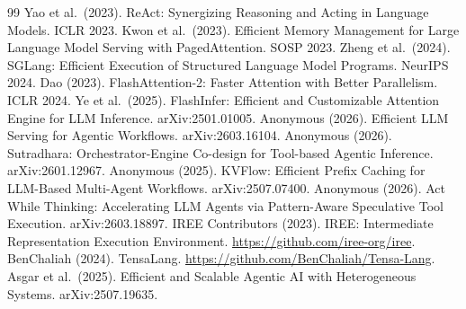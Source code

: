 \documentclass[10pt,twocolumn]{article}
\begin{document}

\begin{thebibliography}{99}
 Yao et al.\ (2023). ReAct: Synergizing Reasoning and Acting in Language Models. ICLR 2023.
 Kwon et al.\ (2023). Efficient Memory Management for Large Language Model Serving with PagedAttention. SOSP 2023.
 Zheng et al.\ (2024). SGLang: Efficient Execution of Structured Language Model Programs. NeurIPS 2024.
 Dao (2023). FlashAttention-2: Faster Attention with Better Parallelism. ICLR 2024.
 Ye et al.\ (2025). FlashInfer: Efficient and Customizable Attention Engine for LLM Inference. arXiv:2501.01005.
 Anonymous (2026). Efficient LLM Serving for Agentic Workflows. arXiv:2603.16104.
 Anonymous (2026). Sutradhara: Orchestrator-Engine Co-design for Tool-based Agentic Inference. arXiv:2601.12967.
 Anonymous (2025). KVFlow: Efficient Prefix Caching for LLM-Based Multi-Agent Workflows. arXiv:2507.07400.
 Anonymous (2026). Act While Thinking: Accelerating LLM Agents via Pattern-Aware Speculative Tool Execution. arXiv:2603.18897.
 IREE Contributors (2023). IREE: Intermediate Representation Execution Environment. \url{https://github.com/iree-org/iree}.
 BenChaliah (2024). TensaLang. \url{https://github.com/BenChaliah/Tensa-Lang}.
 Asgar et al.\ (2025). Efficient and Scalable Agentic AI with Heterogeneous Systems. arXiv:2507.19635.
\end{thebibliography}
\end{document}
